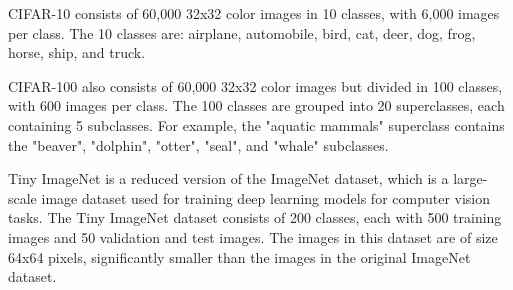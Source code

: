 CIFAR-10 consists of 60,000 32x32 color images in 10 classes, with 6,000 images per class. The 10 classes are: airplane, automobile, bird, cat, deer, dog, frog, horse, ship, and truck.

CIFAR-100 also consists of 60,000 32x32 color images but divided in 100 classes, with 600 images per class. The 100 classes are grouped into 20 superclasses, each containing 5 subclasses. For example, the "aquatic mammals" superclass contains the "beaver", "dolphin", "otter", "seal", and "whale" subclasses.

Tiny ImageNet is a reduced version of the ImageNet dataset, which is a large-scale image dataset used for training deep learning models for computer vision tasks. The Tiny ImageNet dataset consists of 200 classes, each with 500 training images and 50 validation and test images. The images in this dataset are of size 64x64 pixels, significantly smaller than the images in the original ImageNet dataset.

